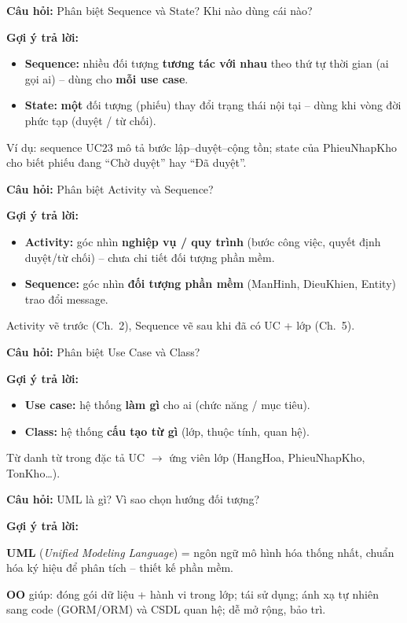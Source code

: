 \documentclass[12pt,a4paper]{article}
\newcommand{\cau}[1]{\textbf{\textcolor{qblue}{Câu hỏi:}} #1}
\newcommand{\traloi}{\par\smallskip\textbf{\textcolor{qblue!70!black}{Gợi ý trả lời:}}\par}
\begin{document}
\begin{cauhoi}[Câu 9]
\cau{Phân biệt Sequence và State? Khi nào dùng cái nào?}
\traloi
\begin{itemize}[leftmargin=1.4em,itemsep=2pt]
  \item \textbf{Sequence:} nhiều đối tượng \textbf{tương tác với nhau} theo thứ tự thời gian (ai gọi ai) -- dùng cho \textbf{mỗi use case}.
  \item \textbf{State:} \textbf{một} đối tượng (phiếu) thay đổi trạng thái nội tại -- dùng khi vòng đời phức tạp (duyệt / từ chối).
\end{itemize}
Ví dụ: sequence UC23 mô tả bước lập--duyệt--cộng tồn; state của PhieuNhapKho cho biết phiếu đang ``Chờ duyệt'' hay ``Đã duyệt''.
\end{cauhoi}

\begin{cauhoi}[Câu 10]
\cau{Phân biệt Activity và Sequence?}
\traloi
\begin{itemize}[leftmargin=1.4em,itemsep=2pt]
  \item \textbf{Activity:} góc nhìn \textbf{nghiệp vụ / quy trình} (bước công việc, quyết định duyệt/từ chối) -- chưa chi tiết đối tượng phần mềm.
  \item \textbf{Sequence:} góc nhìn \textbf{đối tượng phần mềm} (ManHinh, DieuKhien, Entity) trao đổi message.
\end{itemize}
Activity vẽ trước (Ch.\ 2), Sequence vẽ sau khi đã có UC + lớp (Ch.\ 5).
\end{cauhoi}

\begin{cauhoi}[Câu 11]
\cau{Phân biệt Use Case và Class?}
\traloi
\begin{itemize}[leftmargin=1.4em,itemsep=2pt]
  \item \textbf{Use case:} hệ thống \textbf{làm gì} cho ai (chức năng / mục tiêu).
  \item \textbf{Class:} hệ thống \textbf{cấu tạo từ gì} (lớp, thuộc tính, quan hệ).
\end{itemize}
Từ danh từ trong đặc tả UC $\rightarrow$ ứng viên lớp (HangHoa, PhieuNhapKho, TonKho\ldots).
\end{cauhoi}

\begin{cauhoi}[Câu 12]
\cau{UML là gì? Vì sao chọn hướng đối tượng?}
\traloi
\textbf{UML} (\textit{Unified Modeling Language}) = ngôn ngữ mô hình hóa thống nhất, chuẩn hóa ký hiệu để phân tích -- thiết kế phần mềm.

\textbf{OO} giúp: đóng gói dữ liệu + hành vi trong lớp; tái sử dụng; ánh xạ tự nhiên sang code (GORM/ORM) và CSDL quan hệ; dễ mở rộng, bảo trì.
\end{cauhoi}
\end{document}
